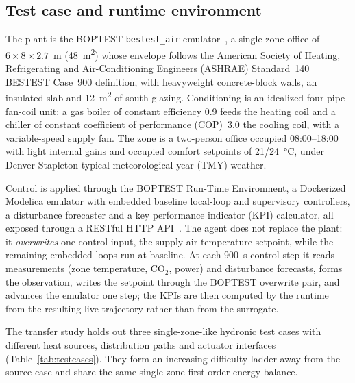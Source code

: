 \documentclass[5p]{elsarticle}
\begin{document}
\subsection{Test case and runtime environment}\label{ssec:testcase}
The plant is the BOPTEST \texttt{bestest\_air} emulator~\cite{Blum2021BOPTEST,Wetter2014Modelica}, a
single-zone office of $6\times8\times2.7$~m (\SI{48}{\meter\squared}) whose envelope follows the
American Society of Heating, Refrigerating and Air-Conditioning Engineers (ASHRAE) Standard~140 BESTEST Case~900 definition, with heavyweight concrete-block walls, an insulated
slab and \SI{12}{\meter\squared} of south glazing. Conditioning is an idealized four-pipe fan-coil
unit: a gas boiler of constant efficiency 0.9 feeds the heating coil and a chiller of constant
coefficient of performance (COP)~3.0 the cooling coil, with a variable-speed supply fan. The zone is a two-person office occupied
08:00--18:00 with light internal gains and occupied comfort setpoints of 21/\SI{24}{\celsius}, under
Denver-Stapleton typical meteorological year (TMY) weather.

Control is applied through the BOPTEST Run-Time Environment, a Dockerized Modelica emulator with
embedded baseline local-loop and supervisory controllers, a disturbance forecaster and a key performance indicator (KPI)
calculator, all exposed through a RESTful HTTP API~\cite{Arroyo2021GymBOPTEST}. The agent does not
replace the plant: it \emph{overwrites} one control input, the supply-air temperature setpoint,
while the remaining embedded loops run at baseline. At each \SI{900}{\second} control step it reads
measurements (zone temperature, CO$_2$, power) and disturbance forecasts, forms the observation,
writes the setpoint through the BOPTEST overwrite pair, and advances the emulator one step; the KPIs
are then computed by the runtime from the resulting live trajectory rather than from the surrogate.

The transfer study holds out three single-zone-like hydronic test cases with different heat sources,
distribution paths and actuator interfaces (Table~\ref{tab:testcases}). They form an
increasing-difficulty ladder away from the source case and share the same single-zone first-order
energy balance.
\end{document}
